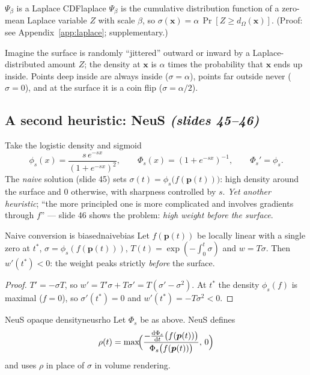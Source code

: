 \documentclass[11pt,a4paper]{article}
\newcommand{\bx}{{\bm{x}}}
\newcommand{\bp}{{\bm{p}}}
\begin{document}
\begin{Proposition}{$\Psi_\beta$ is a Laplace CDF}{laplace}
$\Psi_\beta$ is the cumulative distribution function of a zero-mean Laplace variable $Z$ with scale $\beta$, so
$\sigma(\bx)=\alpha\,\Pr[Z\ge d_\Omega(\bx)]$. (Proof: see Appendix~\ref{app:laplace}; supplementary.)
\end{Proposition}
\begin{intuition}
Imagine the surface is randomly ``jittered'' outward or inward by a Laplace-distributed amount $Z$; the density at $\bx$ is
$\alpha$ times the probability that $\bx$ ends up inside. Points deep inside are always inside ($\sigma=\alpha$),
points far outside never ($\sigma=0$), and at the surface it is a coin flip ($\sigma=\alpha/2$).
\end{intuition}

\subsection{A second heuristic: NeuS \emph{(slides 45--46)}}
Take the logistic density and sigmoid
\[
\phi_s(x)=\frac{s\,e^{-sx}}{(1+e^{-sx})^2},\qquad \Phi_s(x)=(1+e^{-sx})^{-1},\qquad \Phi_s'=\phi_s .
\]
The \emph{naive} solution (slide 45) sets $\sigma(t)=\phi_s\bigl(f(\bp(t))\bigr)$: high density around the surface and $0$
otherwise, with sharpness controlled by $s$. \emph{Yet another heuristic}; ``the more principled one is more complicated and
involves gradients through $f$'' --- slide 46 shows the problem: \emph{high weight before the surface}.

\begin{Proposition}{Naive conversion is biased}{naivebias}
Let $f(\bp(t))$ be locally linear with a single zero at $t^*$, $\sigma=\phi_s(f(\bp(t)))$, $T(t)=\exp(-\int_0^t\sigma)$ and
$w=T\sigma$. Then $w'(t^*)<0$: the weight peaks strictly \emph{before} the surface.
\end{Proposition}
\begin{proof}
$T'=-\sigma T$, so $w'=T'\sigma+T\sigma'=T(\sigma'-\sigma^2)$. At $t^*$ the density $\phi_s(f)$ is maximal ($f=0$), so $\sigma'(t^*)=0$
and $w'(t^*)=-T\sigma^2<0$.
\end{proof}

\begin{Definition}{NeuS opaque density}{neusrho}
Let $\Phi_s$ be as above. NeuS defines
\[
\rho(t)=\max\!\Bigl(\frac{-\frac{\mathrm d\Phi_s}{\mathrm dt}\bigl(f(\bp(t))\bigr)}{\Phi_s\bigl(f(\bp(t))\bigr)},\,0\Bigr)
\]
and uses $\rho$ in place of $\sigma$ in volume rendering.
\end{Definition}
\end{document}
